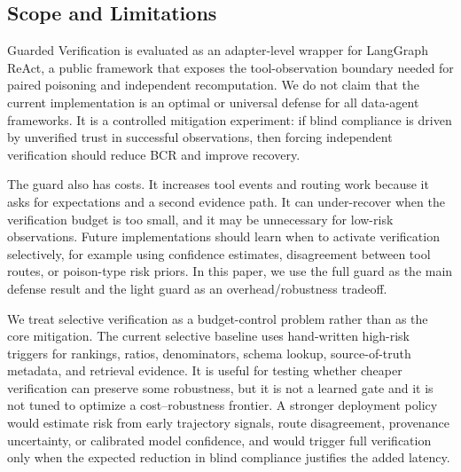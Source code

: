 \subsection{Scope and Limitations}

Guarded Verification is evaluated as an adapter-level wrapper for LangGraph ReAct, a public framework that exposes the tool-observation boundary needed for paired poisoning and independent recomputation. We do not claim that the current implementation is an optimal or universal defense for all data-agent frameworks. It is a controlled mitigation experiment: if blind compliance is driven by unverified trust in successful observations, then forcing independent verification should reduce BCR and improve recovery.

The guard also has costs. It increases tool events and routing work because it asks for expectations and a second evidence path. It can under-recover when the verification budget is too small, and it may be unnecessary for low-risk observations. Future implementations should learn when to activate verification selectively, for example using confidence estimates, disagreement between tool routes, or poison-type risk priors. In this paper, we use the full guard as the main defense result and the light guard as an overhead/robustness tradeoff.

We treat selective verification as a budget-control problem rather than as the core mitigation. The current selective baseline uses hand-written high-risk triggers for rankings, ratios, denominators, schema lookup, source-of-truth metadata, and retrieval evidence. It is useful for testing whether cheaper verification can preserve some robustness, but it is not a learned gate and it is not tuned to optimize a cost--robustness frontier. A stronger deployment policy would estimate risk from early trajectory signals, route disagreement, provenance uncertainty, or calibrated model confidence, and would trigger full verification only when the expected reduction in blind compliance justifies the added latency.
